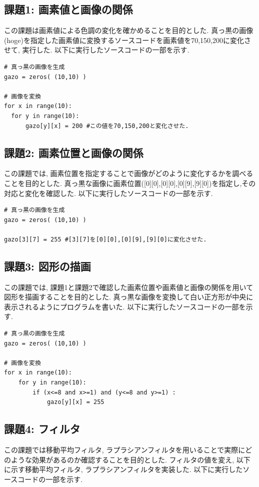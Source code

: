 \documentclass[a4paper,11pt,uplatex, titlepage]{jsarticle}
\begin{document}
\subsection{課題1: 画素値と画像の関係}
この課題は画素値による色調の変化を確かめることを目的とした.
真っ黒の画像(hoge)を指定した画素値に変換するソースコードを画素値を70,150,200に変化させて, 実行した.
以下に実行したソースコードの一部を示す.

\begin{lstlisting}[basicstyle=\ttfamily\footnotesize]
# 真っ黒の画像を生成
gazo = zeros( (10,10) )

# 画像を変換
for x in range(10):
  for y in range(10):
      gazo[y][x] = 200 #この値を70,150,200と変化させた.
\end{lstlisting}

\subsection{課題2: 画素位置と画像の関係}
この課題では, 画素位置を指定することで画像がどのように変化するかを調べることを目的とした.
真っ黒な画像に画素位置([0][0],[0][0],[0][9],[9][0])を指定し,その対応と変化を確認した.
以下に実行したソースコードの一部を示す.

\begin{lstlisting}[basicstyle=\ttfamily\footnotesize]
# 真っ黒の画像を生成
gazo = zeros( (10,10) )

gazo[3][7] = 255 #[3][7]を[0][0],[0][9],[9][0]に変化させた.
\end{lstlisting}

\subsection{課題3: 図形の描画}
この課題では, 課題1と課題2で確認した画素位置や画素値と画像の関係を用いて図形を描画することを目的とした.
真っ黒な画像を変換して白い正方形が中央に表示されるようにプログラムを書いた.
以下に実行したソースコードの一部を示す.
\begin{lstlisting}[basicstyle=\ttfamily\footnotesize]
# 真っ黒の画像を生成
gazo = zeros( (10,10) )

# 画像を変換
for x in range(10):
    for y in range(10):
        if (x<=8 and x>=1) and (y<=8 and y>=1) :
            gazo[y][x] = 255
\end{lstlisting}

\subsection{課題4: フィルタ}
この課題では移動平均フィルタ, ラプラシアンフィルタを用いることで実際にどのような効果があるのか確認することを目的とした.
フィルタの値を変え, 以下に示す移動平均フィルタ, ラプラシアンフィルタを実装した.
以下に実行したソースコードの一部を示す.
\end{document}
